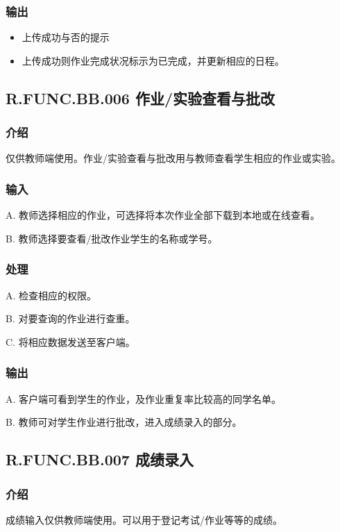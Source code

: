 \begin{enumerate}
      \subsubsection{输出}
      \begin{itemize}
        \item 上传成功与否的提示
        \item 上传成功则作业完成状况标示为已完成，并更新相应的日程。
      \end{itemize}

    \subsection{R.FUNC.BB.006 作业/实验查看与批改}
      \subsubsection{介绍}
      仅供教师端使用。作业/实验查看与批改用与教师查看学生相应的作业或实验。
      \subsubsection{输入}
	A. 教师选择相应的作业，可选择将本次作业全部下载到本地或在线查看。

	B. 教师选择要查看/批改作业学生的名称或学号。

	\subsubsection{处理}
	A. 检查相应的权限。

	B. 对要查询的作业进行查重。

	C. 将相应数据发送至客户端。

	\subsubsection{输出}
	A. 客户端可看到学生的作业，及作业重复率比较高的同学名单。

	B. 教师可对学生作业进行批改，进入成绩录入的部分。

  \subsection{R.FUNC.BB.007 成绩录入}
    \subsubsection{介绍}
    成绩输入仅供教师端使用。可以用于登记考试/作业等等的成绩。

\end{enumerate}
